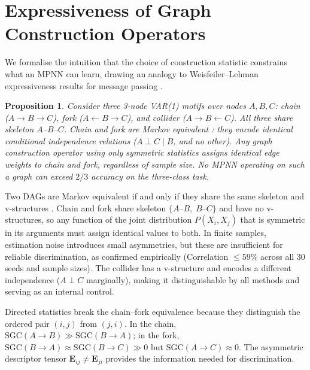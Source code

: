 \documentclass{article}
\theoremstyle{plain}
\newtheorem{proposition}{Proposition}[section]
\begin{document}
\section{Expressiveness of Graph Construction Operators}
\label{sec:theory}

We formalise the intuition that the choice of construction statistic constrains what an MPNN can learn, drawing an analogy to Weisfeiler--Lehman expressiveness results for message passing \citep{xu2019,morris2019}.

\begin{proposition}
Consider three 3-node VAR(1) motifs over nodes $A, B, C$: chain ($A \to B \to C$), fork ($A \leftarrow B \to C$), and collider ($A \to B \leftarrow C$). All three share skeleton $A$--$B$--$C$. Chain and fork are Markov equivalent \citep{verma1990}: they encode identical conditional independence relations ($A \perp C \mid B$, and no other). Any graph construction operator using only symmetric statistics assigns identical edge weights to chain and fork, regardless of sample size. No MPNN operating on such a graph can exceed $2/3$ accuracy on the three-class task.
\end{proposition}

Two DAGs are Markov equivalent if and only if they share the same skeleton and v-structures \citep{verma1990}. Chain and fork share skeleton $\{A$--$B,\; B$--$C\}$ and have no v-structures, so any function of the joint distribution $P(X_i, X_j)$ that is symmetric in its arguments must assign identical values to both. In finite samples, estimation noise introduces small asymmetries, but these are insufficient for reliable discrimination, as confirmed empirically (Correlation $\leq 59$\% across all 30 seeds and sample sizes). The collider has a v-structure and encodes a different independence ($A \perp C$ marginally), making it distinguishable by all methods and serving as an internal control.

Directed statistics break the chain--fork equivalence because they distinguish the ordered pair $(i, j)$ from $(j, i)$. In the chain, $\mathrm{SGC}(A \to B) \gg \mathrm{SGC}(B \to A)$; in the fork, $\mathrm{SGC}(B \to A) \approx \mathrm{SGC}(B \to C) \gg 0$ but $\mathrm{SGC}(A \to C) \approx 0$. The asymmetric descriptor tensor $\mathbf{E}_{ij} \neq \mathbf{E}_{ji}$ provides the information needed for discrimination.
\end{document}
